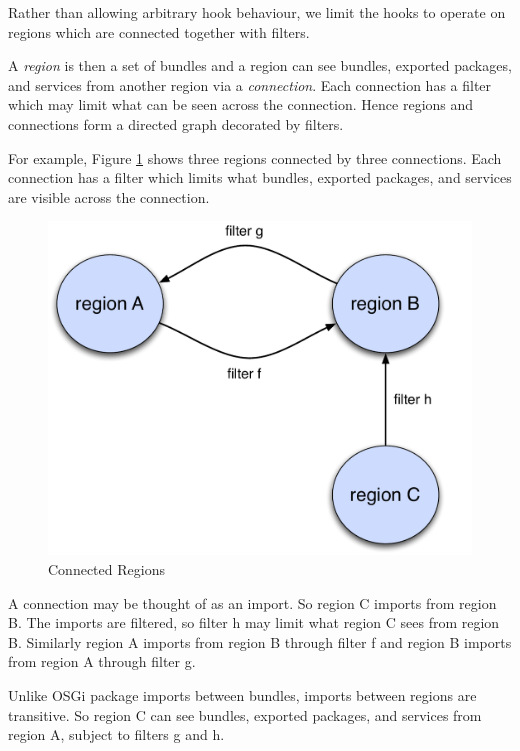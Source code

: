 \documentclass[a4paper,9pt]{article}
\begin{document}
Rather than allowing arbitrary hook behaviour, we limit the hooks to operate on regions
which are connected together with filters.

A \textit{region} is then a set of bundles and a region can see bundles, exported packages, and services
from another region via a \textit{connection}. Each connection has a filter which may limit
what can be seen across the connection.
Hence regions and connections form a directed graph decorated by filters.

For example, Figure \ref{fig:conn} shows three regions connected by three connections.
Each connection has a filter which limits what bundles, exported packages, and services
are visible across the connection.

\begin{figure}[h!]
\begin{center}
\includegraphics*[scale=0.35]{connected-regions.pdf}
\caption{Connected Regions}
\end{center}
\label{fig:conn}
\end{figure}

A connection may be thought of as an import. So region C imports from region B.
The imports are filtered, so filter h may limit what region C sees from region B.
Similarly region A imports from region B through filter f and region B imports from region A through
filter g.

Unlike OSGi package imports between bundles, imports between regions are transitive.
So region C can see bundles, exported packages, and services from region A, subject to filters g and h.
\end{document}
